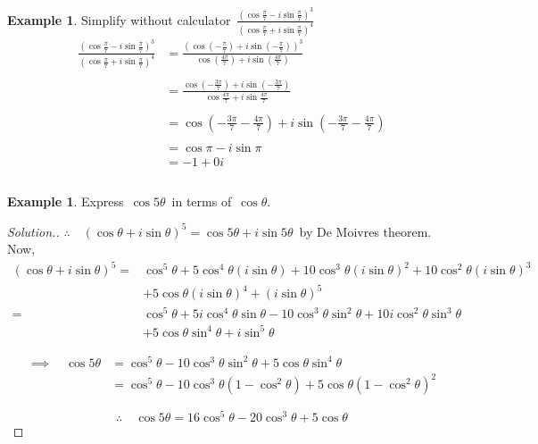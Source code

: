\documentclass[11pt,a4paper]{article}
\theoremstyle{definition}
\newtheorem{example}[thm]{Example}
\newenvironment{solution}
  {\renewcommand{\qedsymbol}{}\begin{proof}[\textit{Solution}.]}
  {\end{proof}}
\begin{document}
\begin{example}

Simplify without calculator $\,\displaystyle{\frac{\left(\cos \frac{\pi}{7} - i\sin \frac{\pi}{7}\right)^3}{\left(\cos \frac{\pi}{7}+ i\sin \frac{\pi}{7}\right)^4}}$\\




\begin{align*}
\frac{\left(\cos \frac{\pi}{7} - i\sin \frac{\pi}{7}\right)^3}{\left(\cos \frac{\pi}{7}+ i\sin \frac{\pi}{7}\right)^4} & = \frac{\left(\cos \left(-\frac{\pi}{7}\right) + i\sin \left(-\frac{\pi}{7}\right)\right)^3}{\cos \left(\frac{4\pi}{7}\right)+ i\sin \left(\frac{4\pi}{7}\right)}\\\\
& = \frac{\cos \left(-\frac{3\pi}{7}\right) + i\sin \left(-\frac{3\pi}{7}\right)}{\cos \frac{4\pi}{7}+ i\sin \frac{4\pi}{7}}\\\\
& = \cos \left(-\frac{3\pi}{7}-\frac{4\pi}{7}\right) + i \sin \left(-\frac{3\pi}{7}-\frac{4\pi}{7}\right)\\\\
& = \cos \pi - i \sin \pi\\
& = -1 + 0 i\\\\
\end{align*}
\end{example}
\begin{example}

Express $\,\cos 5\theta\,$ in terms of $\, \cos \theta$.
\end{example}
\begin{solution}

$\therefore\quad  \left( \cos \theta + i\sin \theta \right)^5 = \cos 5\theta + i\sin 5\theta\,$ by De Moivres theorem.\\

Now, 
\begin{align*}
\left( \cos \theta + i\sin \theta \right)^5  = & \cos^5\theta + 5\cos^4 \theta \left(i\sin \theta\right) + 10\cos^3\theta\left(i\sin\theta\right)^2 + 10\cos^2\theta\left(i\sin \theta\right)^3\\ 
& + 5\cos \theta \left(i\sin\theta\right)^4  + \left(i\sin \theta\right)^5\\
= & \cos^5\theta + 5i\cos^4 \theta \sin \theta - 10\cos^3\theta\sin^2\theta + 10 i \cos^2\theta \sin^3 \theta\\ 
& + 5\cos \theta \sin^4\theta  + i\sin^5 \theta
\end{align*}



\begin{align*}
\implies\quad  \cos 5\theta & = \cos^5\theta - 10\cos^3\theta \sin^2\theta + 5\cos\theta \sin^4\theta\\
& = \cos^5\theta - 10\cos^3\theta \left(1 - \cos^2\theta\right) + 5\cos\theta \left(1 - \cos^2\theta\right)^2
\end{align*}


$$\therefore\quad  \cos 5\theta  = 16\cos^5\theta - 20\cos^3\theta + 5\cos \theta$$
\end{solution}
\end{document}
